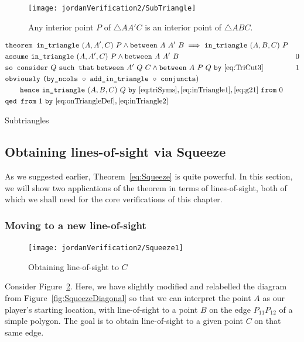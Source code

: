 \begin{figure}
\centering\texttt{[image: jordanVerification2/SubTriangle]}
\caption{Any interior point $P$ of $\triangle AA'C$ is an interior point of $\triangle ABC$.}
\label{fig:SubTriangle}
\end{figure}

\begin{boxedfigure}
\small
\begin{align*}
&\code{theorem }\code{in\_triangle}\ (A,A',C)\ P \wedge \between{A}{A'}{B} 
                  \implies \code{in\_triangle}\ (A,B,C)\ P\\
&\code{assume}\ \code{in\_triangle}\ (A,A',C)\ P \wedge \between{A}{A'}{B} & 0 \\
&\code{so consider}\ Q\ \code{such that}\ \between{A'}{Q}{C} \wedge \between{A}{P}{Q} \ \code{by}\ \eqref{eq:TriCut3} & 1\\
&\code{obviously}\ \code{(by\_ncols}\ \circ\ \code{add\_in\_triangle}\ \circ\ \code{conjuncts})\\
&\qquad \code{hence}\ \code{in\_triangle}\ (A,B,C)\ Q\ \code{by}\ \eqref{eq:triSyms},\eqref{eq:inTriangle1},\eqref{eq:g21}\ \code{from}\ 0\\
&\code{qed from}\ 1\ \code{by}\ \eqref{eq:onTriangleDef},\eqref{eq:inTriangle2}
\end{align*}
\caption{Subtriangles}
\label{fig:SubTriangleProof}
\end{boxedfigure}

\subsection{Obtaining lines-of-sight via Squeeze}\label{sec:SqueezeEye}
As we suggested earlier, Theorem~\ref{eq:Squeeze} is quite powerful. In this section, we will show two applications of the theorem in terms of lines-of-sight, both of which we shall need for the core verifications of this chapter. 

\subsubsection{Moving to a new line-of-sight}\label{sec:MoveToNew}
\begin{figure}
\centering\texttt{[image: jordanVerification2/Squeeze1]}
\caption{Obtaining line-of-sight to $C$}
\label{fig:Squeeze1}
\end{figure}

Consider Figure~\ref{fig:Squeeze1}. Here, we have slightly modified and relabelled the diagram from Figure~\ref{fig:SqueezeDiagonal} so that we can interpret the point $A$ as our player's starting location, with line-of-sight to a point $B$ on the edge $P_{11}P_{12}$ of a simple polygon. The goal is to obtain line-of-sight to a given point $C$ on that same edge.


